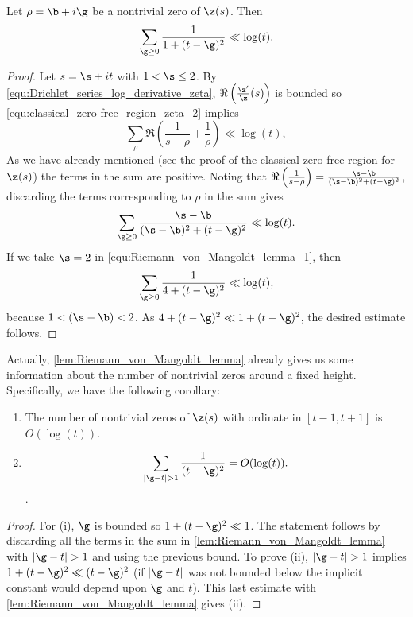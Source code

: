       \begin{lemma}\label{lem:Riemann_von_Mangoldt_lemma}
        Let $\rho = \b+i\g$ be a nontrivial zero of $\z(s)$. Then
        \[
          \sum_{\g \ge 0}\frac{1}{1+(t-\g)^{2}} \ll \log(t).
        \]
      \end{lemma}
      \begin{proof}
        Let $s = \s+it$ with $1 < \s \le 2$. By \cref{equ:Drichlet_series_log_derivative_zeta}, $\Re\left(\frac{\z'}{\z}(s)\right)$ is bounded so \cref{equ:classical_zero-free_region_zeta_2} implies
        \[
          \sum_{\rho}\Re\left(\frac{1}{s-\rho}+\frac{1}{\rho}\right) \ll \log(t),
        \]
        As we have already mentioned (see the proof of the classical zero-free region for $\z(s)$) the terms in the sum are positive. Noting that $\Re\left(\frac{1}{s-\rho}\right) = \frac{\s-\b}{(\s-\b)^{2}+(t-\g)^{2}}$, discarding the terms corresponding to $\rho$ in the sum gives
        \begin{equation}\label{equ:Riemann_von_Mangoldt_lemma_1}
          \sum_{\g \ge 0}\frac{\s-\b}{(\s-\b)^{2}+(t-\g)^{2}} \ll \log(t).
        \end{equation}
        If we take $\s = 2$ in \cref{equ:Riemann_von_Mangoldt_lemma_1}, then
        \[
          \sum_{\g \ge 0}\frac{1}{4+(t-\g)^{2}} \ll \log(t),
        \]
        because $1 < (\s-\b) < 2$. As $4+(t-\g)^{2} \ll 1+(t-\g)^{2}$, the desired estimate follows.
      \end{proof}

      Actually, \cref{lem:Riemann_von_Mangoldt_lemma} already gives us some information about the number of nontrivial zeros around a fixed height. Specifically, we have the following corollary:

      \begin{corollary}\label{cor:Riemann_von_Mangoldt_corollary}
        \phantom{ }
        \begin{enumerate}[label=(\roman*)]
          \item The number of nontrivial zeros of $\z(s)$ with ordinate in $[t-1,t+1]$ is $O(\log(t))$.
          \item 
          \[
            \sum_{|\g-t| > 1}\frac{1}{(t-\g)^{2}} = O(\log(t)).
          \].
        \end{enumerate}
      \end{corollary}
      \begin{proof}
        For (i), $\g$ is bounded so $1+(t-\g)^{2} \ll 1$. The statement follows by discarding all the terms in the sum in \cref{lem:Riemann_von_Mangoldt_lemma} with $|\g-t| > 1$ and using the previous bound. To prove (ii), $|\g-t| > 1$ implies $1+(t-\g)^{2} \ll (t-\g)^{2}$ (if $|\g-t|$ was not bounded below the implicit constant would depend upon $\g$ and $t$). This last estimate with \cref{lem:Riemann_von_Mangoldt_lemma} gives (ii).
      \end{proof}

